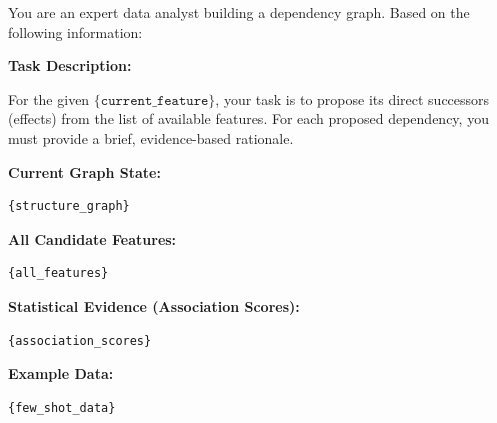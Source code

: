 \begin{tcolorbox}[
    float*=t, width=\textwidth, floatplacement=htbp,
    colback=pink!10!white,  %
    colframe=pink!75!black, %
    title={Prompt for Link Generation in Dependency Discovery ($\pi_\mathtt{generation}$)}, %
    fonttitle=\bfseries\color{white}, 
    arc=2mm, %
    boxrule=1pt %
]
\small %

You are an expert data analyst building a dependency graph. Based on the following information:

\vspace{\medskipamount} %

\textbf{Task Description:}

For the given $\texttt{\{current\_feature}\}$, your task is to propose its direct successors (effects) 
from the list of available features. For each proposed dependency, you must provide a 
brief, evidence-based rationale.

\vspace{\medskipamount} %

\textbf{Current Graph State:}
\begin{verbatim}
{structure_graph}
\end{verbatim}
\vspace{\medskipamount} %

\textbf{All Candidate Features:}
\begin{verbatim}
{all_features}
\end{verbatim}
\vspace{\medskipamount} %

\textbf{Statistical Evidence (Association Scores):}
\begin{verbatim}
{association_scores}
\end{verbatim}
\vspace{\medskipamount} %

\textbf{Example Data:}
\begin{verbatim}
{few_shot_data}
\end{verbatim}
\vspace{\medskipamount} %


\end{tcolorbox}
